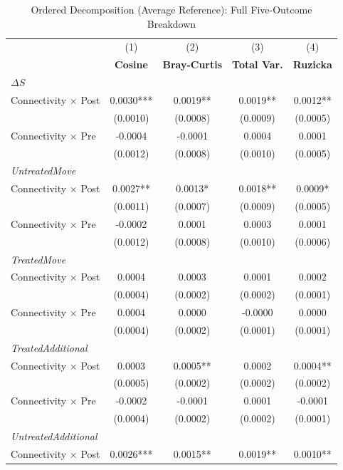 \begin{table}[H]
\centering
\caption{Ordered Decomposition (Average Reference): Full Five-Outcome Breakdown}
\scriptsize
\setlength{\tabcolsep}{8pt}
\begin{tabular}{lcccc}
\hline\hline
 & (1) & (2) & (3) & (4) \\
 & \textbf{Cosine} & \textbf{Bray-Curtis} & \textbf{Total Var.} & \textbf{Ruzicka} \\
\hline
\multicolumn{5}{l}{\textit{$\Delta S$}} \\
\quad Connectivity $\times$ Post & 0.0030*** & 0.0019** & 0.0019** & 0.0012** \\
\quad & (0.0010) & (0.0008) & (0.0009) & (0.0005) \\
\quad Connectivity $\times$ Pre  & -0.0004 & -0.0001 & 0.0004 & 0.0001 \\
\quad & (0.0012) & (0.0008) & (0.0010) & (0.0005) \\
\hline
\multicolumn{5}{l}{\textit{UntreatedMove}} \\
\quad Connectivity $\times$ Post & 0.0027** & 0.0013* & 0.0018** & 0.0009* \\
\quad & (0.0011) & (0.0007) & (0.0009) & (0.0005) \\
\quad Connectivity $\times$ Pre  & -0.0002 & 0.0001 & 0.0003 & 0.0001 \\
\quad & (0.0012) & (0.0008) & (0.0010) & (0.0006) \\
\hline
\multicolumn{5}{l}{\textit{TreatedMove}} \\
\quad Connectivity $\times$ Post & 0.0004 & 0.0003 & 0.0001 & 0.0002 \\
\quad & (0.0004) & (0.0002) & (0.0002) & (0.0001) \\
\quad Connectivity $\times$ Pre  & 0.0004 & 0.0000 & -0.0000 & 0.0000 \\
\quad & (0.0004) & (0.0002) & (0.0001) & (0.0001) \\
\hline
\multicolumn{5}{l}{\textit{TreatedAdditional}} \\
\quad Connectivity $\times$ Post & 0.0003 & 0.0005** & 0.0002 & 0.0004** \\
\quad & (0.0005) & (0.0002) & (0.0002) & (0.0002) \\
\quad Connectivity $\times$ Pre  & -0.0002 & -0.0001 & 0.0001 & -0.0001 \\
\quad & (0.0004) & (0.0002) & (0.0002) & (0.0001) \\
\hline
\multicolumn{5}{l}{\textit{UntreatedAdditional}} \\
\quad Connectivity $\times$ Post & 0.0026*** & 0.0015** & 0.0019** & 0.0010** \\

\end{tabular}
\end{table}
